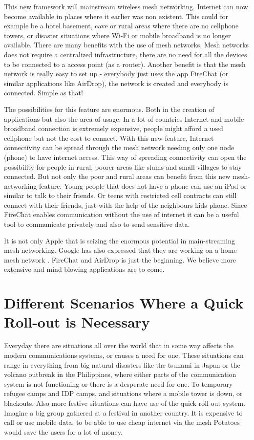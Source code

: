 This new framework will mainstream wireless mesh networking. Internet can now become available in places where it earlier was non existent. This could for example be a hotel basement, cave or rural areas where there are no cellphone towers, or disaster situations where Wi-Fi or mobile broadband  is no longer available. There are many benefits with the use of mesh networks. Mesh networks does not require a centralized infrastructure, there are no need for all the devices to be connected to a access point (as a router). Another benefit is that the mesh network is really easy to set up - everybody just uses the app FireChat (or similar applications like AirDrop), the network is created and everybody is connected. Simple as that! 

The possibilities for this feature are enormous. Both in the creation of applications but also the area of usage. In a lot of countries Internet and mobile broadband connection is extremely expensive, people might afford a used cellphone but not the cost to connect. With this new feature, Internet connectivity can be spread through the mesh network needing only one node (phone) to have internet access. This way of spreading connectivity can open the possibility for people in rural, poorer areas like slums and small villages to stay connected. But not only the poor and rural areas can benefit from this new mesh-networking feature. Young people that does not have a phone can use an iPad or similar to talk to their friends. Or teens with restricted cell contracts can still connect with their friends, just with the help of the neighbours kids phone. Since FireChat enables communication without the use of internet it can be a useful tool to communicate privately and also to send sensitive data.
 
It is not only Apple that is seizing the enormous potential in main-streaming mesh networking. Google has also expressed that they are working on a home mesh network \cite{googleMesh}. FireChat and AirDrop is just the beginning. We believe more extensive and mind blowing applications are to come. 
 
\section{Different Scenarios Where a Quick Roll-out is Necessary}

Everyday there are situations all over the world that in some way affects the modern communications systems, or causes a need for one. These situations can range in everything from big natural disasters like the tsunami in Japan or the volcano outbreak in the Philippines, where either parts of the communication system is not functioning or there is a desperate need for one. To temporary refugee camps and IDP camps, and situations where a mobile tower is down, or blackouts. Also more festive situations can have use of the quick roll-out system. Imagine a big group gathered at a festival in another country. It is expensive to call or use mobile data, to be able to use cheap internet via the mesh Potatoes would save the users for a lot of money. 

